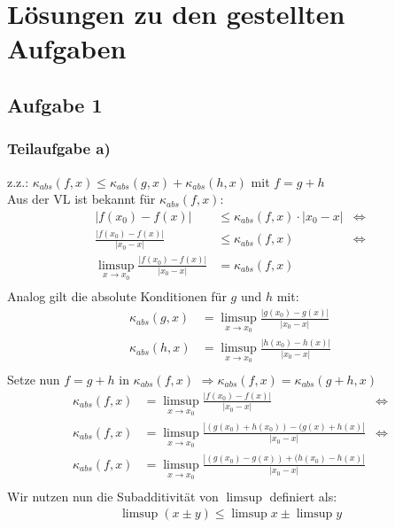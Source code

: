 \documentclass{llncs}
\begin{document}
\chapter*{L\"osungen zu den gestellten Aufgaben}

\section*{Aufgabe 1}

\subsection*{Teilaufgabe a)}
z.z.: $\kappa_{abs}(f,x)\le \kappa_{abs}(g,x) + \kappa_{abs}(h,x) $ mit $f=g+h$\\
Aus der VL ist bekannt für $\kappa_{abs}(f,x)$:\\
\begin{align*}
|f(x_0)-f(x)| &\le \kappa_{abs}(f,x) \cdot |x_0-x| & \Leftrightarrow\\
\frac{|f(x_0)-f(x)|}{|x_0-x|} &\le \kappa_{abs}(f,x) & \Leftrightarrow\\
\limsup_{x \rightarrow x_0} \frac{|f(x_0)-f(x)|}{|x_0-x|} &= \kappa_{abs}(f,x)\\
\end{align*}
Analog gilt die absolute Konditionen für $g$ und $h$ mit:\\
\begin{align*}
\kappa_{abs}(g,x)&=\limsup_{x \rightarrow x_0} \frac{|g(x_0)-g(x)|}{|x_0-x|} \\
\kappa_{abs}(h,x)&=\limsup_{x \rightarrow x_0} \frac{|h(x_0)-h(x)|}{|x_0-x|} \\
\end{align*}
Setze nun $f=g+h$ in  $\kappa_{abs}(f,x)$ $\Rightarrow \kappa_{abs}(f,x) = \kappa_{abs}(g+h,x)$
\begin{align*}
\kappa_{abs}(f,x)&= \limsup_{x \rightarrow x_0} \frac{|f(x_0)-f(x)|}{|x_0-x|} & \Leftrightarrow\\
\kappa_{abs}(f,x)&= \limsup_{x \rightarrow x_0} \frac{|(g(x_0)+h(x_0))-(g(x)+h(x)|}{|x_0-x|} & \Leftrightarrow\\
\kappa_{abs}(f,x)&= \limsup_{x \rightarrow x_0} \frac{|(g(x_0)-g(x))+(h(x_0)-h(x)|}{|x_0-x|} \\
\end{align*}
Wir nutzen nun die Subadditivität von $\limsup$ definiert als:
\begin{align*}
\limsup (x\pm y) \le \limsup x \pm \limsup y
\end{align*}
\end{document}
